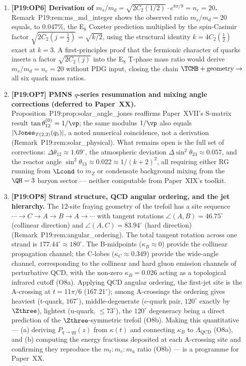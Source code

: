 \begin{enumerate}[label=,leftmargin=*]
\item \textbf{[P19:OP6] Derivation of $m_s/m_d=\sqrt{2C_2(1/2)}\cdot e^{8\pi/9}=n_e=20$.}
Remark~P19:rem:ms\_md\_integer shows the observed ratio $m_s/m_d=20$
equals, to $0.047\%$, the E$_8$ Coxeter prediction multiplied by the
spin-Casimir factor $\sqrt{2C_2(j=\tfrac12)}=\sqrt{k/2}$, using the
structural identity $k=4C_2(\tfrac12)$ exact at $k=3$. A first-principles
proof that the fermionic character of quarks inserts a factor
$\sqrt{2C_2(j)}$ into the E$_8$ T-phase mass ratio would derive
$m_s/m_d=n_e=20$ without PDG input, closing the chain
$\TCMB+\text{geometry}\to$ all six quark mass ratios.

\item \textbf{[P19:OP7] PMNS $q$-series resummation and mixing angle corrections (deferred to Paper~XX).}
Proposition~P19:prop:solar\_angle\_jones reaffirms Paper~XVII's S-matrix
result $\tan\theta_{12}^{(0)}=1/\vp$; the same modulus $1/\vp$ also
equals $|\Jones_{T(2,2)}(q_5)|$, a noted numerical coincidence, not a
derivation (Remark~P19:rem:solar\_physical). What remains open is the
full set of corrections: $\Delta\theta_{12}\approx1.69^\circ$, the atmospheric
deviation $\Delta\sin^2\theta_{23}\approx0.057$, and the reactor angle
$\sin^2\theta_{13}\approx0.022\approx1/(k+2)^2$, all requiring either RG
running from $\Lcond$ to $m_Z$ or condensate background mixing from the
$\QH=3$ baryon sector --- neither computable from Paper~XIX's toolkit.

\item \textbf{[P19:OP8] Strand structure, QCD angular ordering, and the jet hierarchy.}
The 12-site fraying geometry of the trefoil has a site sequence
$\cdots\to C\to A\to B\to A\to\cdots$ with tangent rotations
$\angle(A,B)=46.75^\circ$ (collinear direction) and
$\angle(A,C)=83.94^\circ$ (hard direction) (Remark~P19:rem:angular\_ordering).
The total tangent rotation across one strand is $177.44^\circ\approx180^\circ$.
The B-midpoints ($\kappa_B\approx0$) provide the collinear propagation
channel; the C-lobes ($\kappa_C\approx0.349$) provide the wide-angle
channel, corresponding to the collinear and hard gluon emission channels
of perturbative QCD, with the non-zero $\kappa_B=0.026$ acting as a
topological infrared cutoff (O8a). Applying QCD angular ordering, the
first-jet site is the A-crossing at $t=11\pi/6$ ($167.21^\circ$); among
A-crossings the ordering gives heaviest (t-quark, $167^\circ$),
middle-degenerate (c-quark pair, $120^\circ$ exactly by $\Zthree$),
lightest (u-quark, $\leq73^\circ$), the $120^\circ$ degeneracy being a
direct prediction of the $\Zthree$-symmetric trefoil (O8b). Making this
quantitative --- (a) deriving $P_{q\to qg}(z)$ from $\kappa(t)$ and
connecting $\kappa_B$ to $\Lambda_{\mathrm{QCD}}$ (O8a), and (b) computing
the energy fractions deposited at each A-crossing site and confirming
they reproduce the $m_t:m_c:m_u$ ratio (O8b) --- is a programme for
Paper~XX.


\end{enumerate}
